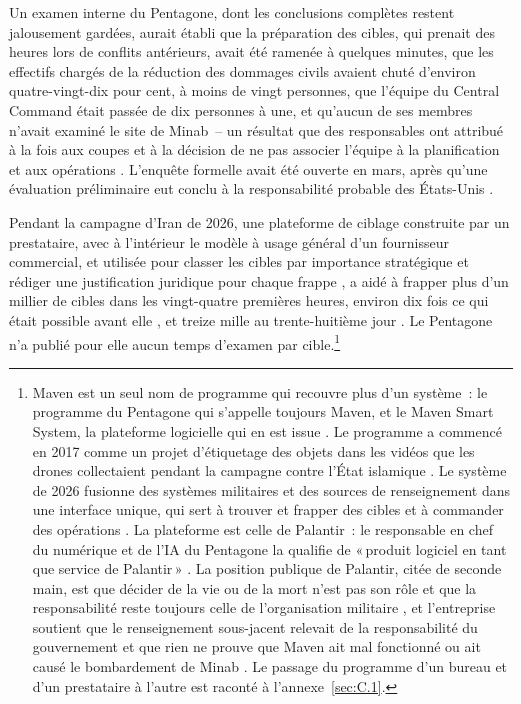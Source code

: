 Un examen interne du Pentagone, dont les conclusions complètes restent jalousement gardées, aurait établi que la préparation des cibles, qui prenait des heures lors de conflits antérieurs, avait été ramenée à quelques minutes, que les effectifs chargés de la réduction des dommages civils avaient chuté d'environ quatre-vingt-dix pour cent, à moins de vingt personnes, que l'équipe du Central Command était passée de dix personnes à une, et qu'aucun de ses membres n'avait examiné le site de Minab~– un résultat que des responsables ont attribué à la fois aux coupes et à la décision de ne pas associer l'équipe à la planification et aux opérations \autocite{Bloomberg2026KillChain}. L'enquête formelle avait été ouverte en mars, après qu'une évaluation préliminaire eut conclu à la responsabilité probable des États-Unis \autocite{NPR2026MinabProbe}.

Pendant la campagne d'Iran de 2026, une plateforme de ciblage construite par un prestataire, avec à l'intérieur le modèle à usage général d'un fournisseur commercial, et utilisée pour classer les cibles par importance stratégique et rédiger une justification juridique pour chaque frappe \autocite{livingstone2026maven}, a aidé à frapper plus d'un millier de cibles dans les vingt-quatre premières heures, environ dix fois ce qui était possible avant elle \autocite{csis2026maven}, et treize mille au trente-huitième jour \autocite{breakingdefense2026maven}. Le Pentagone n'a publié pour elle aucun temps d'examen par cible.\footnote{Maven est un seul nom de programme qui recouvre plus d'un système~: le programme du Pentagone qui s'appelle toujours Maven, et le Maven Smart System, la plateforme logicielle qui en est issue \autocite{csis2026maven}. Le programme a commencé en 2017 comme un projet d'étiquetage des objets dans les vidéos que les drones collectaient pendant la campagne contre l'État islamique \autocite{weisgerber2017maven,fang2019maven}. Le système de 2026 fusionne des systèmes militaires et des sources de renseignement dans une interface unique, qui sert à trouver et frapper des cibles et à commander des opérations \autocite{defensescoop2026transition}. La plateforme est celle de Palantir~: le responsable en chef du numérique et de l'IA du Pentagone la qualifie de «\,produit logiciel en tant que service de Palantir\,» \autocite{defensescoop2026transition}. La position publique de Palantir, citée de seconde main, est que décider de la vie ou de la mort n'est pas son rôle et que la responsabilité reste toujours celle de l'organisation militaire \autocite{lee2026palantir}, et l'entreprise soutient que le renseignement sous-jacent relevait de la responsabilité du gouvernement et que rien ne prouve que Maven ait mal fonctionné ou ait causé le bombardement de Minab \autocite{Bloomberg2026KillChain}. Le passage du programme d'un bureau et d'un prestataire à l'autre est raconté à l'annexe~\ref{sec:C.1}.}

